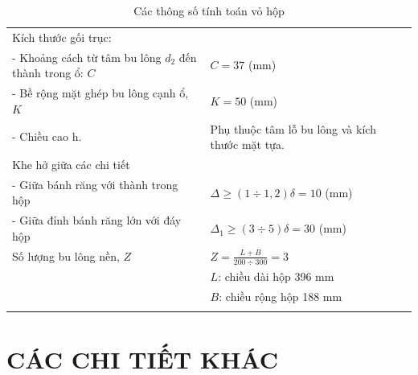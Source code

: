 \begin{longtable}{|p{7.5cm}|p{8.3cm}|}
            Kích thước gối trục: & \\
            - Khoảng cách từ tâm bu lông $d_2$ đến thành trong ổ: $C$ & $C = 37$ (mm) \\
            - Bề rộng mặt ghép bu lông cạnh ổ, $K$ & $K = 50$ (mm) \\
            - Chiều cao h. & Phụ thuộc tâm lỗ bu lông và kích thước mặt tựa. \\
            \hline
            \pagebreak    
            \hline
            Khe hở giữa các chi tiết & \\
            - Giữa bánh răng với thành trong hộp & $\Delta \geq (1 \div 1,2)\delta = 10$ (mm) \\
            - Giữa đỉnh bánh răng lớn với đáy hộp & $\Delta_1 \geq (3 \div 5)\delta = 30$ (mm) \\
            \hline
            Số lượng bu lông nền, $Z$ & $Z = \frac{L + B}{200 \div 300} = 3$ \\
            & $L$: chiều dài hộp 396 mm \\
            & $B$: chiều rộng hộp 188 mm \\
            \hline
            \caption{Các thông số tính toán vỏ hộp}
        \end{longtable}
    \section{CÁC CHI TIẾT KHÁC}

